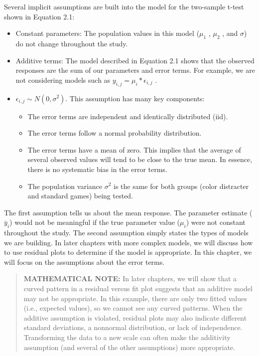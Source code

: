 \documentclass[
]{report}
\begin{document}
Several implicit assumptions are built into the model for the two-sample t-test shown in Equation 2.1:
\vspace{-1em}

\begin{itemize}
\item Constant parameters: The population values in this model ($\scriptstyle \mu_1$ , $\scriptstyle \mu_2$ , and $\scriptstyle \sigma$) do not change throughout the study.
\item Additive terms: The model described in Equation 2.1 shows that the observed responses are the sum of our parameters and error terms. For example, we are not considering models such as
$\scriptstyle y_{i, j} = \mu_i * \epsilon_{i, j}$ .
\item $\scriptstyle \epsilon_{i, j} \sim N(0,\sigma^2)$. This assumption has many key components:
\begin{itemize}
\item The error terms are independent and identically distributed (iid).
\item The error terms follow a normal probability distribution.
\item The error terms have a mean of zero. This implies that the average of several observed values will tend to be close to the true mean. In essence, there is no systematic bias in the error terms.
\item The population variance $\scriptstyle \sigma^2$ is the same for both groups (color distracter and standard games) being tested.
\end{itemize}
\end{itemize}

The first assumption tells us about the mean response. The parameter estimate (\(\scriptstyle \bar{y}_i\)) would not be meaningful if the true parameter value (\(\scriptstyle \mu_i\)) were not constant throughout the study. The second assumption simply states the types of models we are building. In later chapters with more complex models, we will discuss how to use residual plots to determine if the model is appropriate. In this chapter, we will focus on the assumptions about the error terms.

\begin{quote}
\textbf{MATHEMATICAL NOTE:}
In later chapters, we will show that a curved pattern in a residual versus fit plot suggests that an additive model may not be appropriate. In this example, there are only two fitted values (i.e., expected values), so we cannot see any curved patterns. When the additive assumption is violated, residual plots may also indicate different standard deviations, a nonnormal distribution, or lack of independence. Transforming the data to a new scale can often make the additivity assumption (and several of the other assumptions) more appropriate.
\end{quote}
\end{document}
